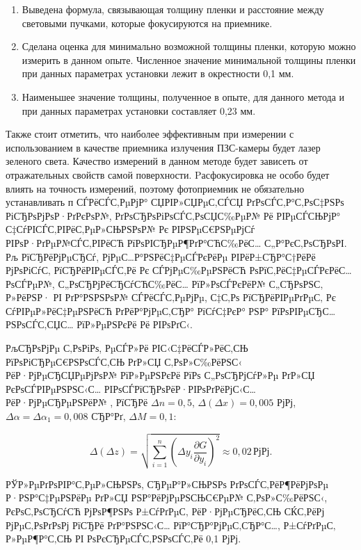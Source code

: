 \begin{enumerate}
\item Выведена формула, связывающая толщину пленки и расстояние между световыми пучками, которые фокусируются на приемнике.
\item Сделана оценка для минимально возможной толщины пленки, которую можно измерить в данном опыте. Численное значение минимальной толщины пленки при данных параметрах установки лежит в окрестности 0,1 мм.
\item Наименьшее значение толщины, полученное в опыте, для данного метода и при данных параметрах установки составляет 0,23 мм.
\end{enumerate}

Также стоит отметить, что наиболее эффективным при измерении с использованием в качестве приемника излучения ПЗС-камеры будет лазер зеленого света. Качество измерений в данном методе будет зависеть от отражательных свойств самой поверхности. Pасфокусировка не особо будет влиять на точность измерений, поэтому фотоприемник не обязательно устанавливать п СЃРёСЃС‚РµРјР° СЏРІР»СЏРµС‚СЃСЏ РґРѕСЃС‚Р°С‚РѕС‡РЅРѕ РіСЂРѕРјРѕР·РґРєРѕР№, РґРѕСЂРѕРіРѕСЃС‚РѕСЏС‰РµР№ Рё РІРµСЃСЊРјР° С‡СѓРІСЃС‚РІРёС‚РµР»СЊРЅРѕР№ Рє РІРЅРµС€РЅРµРјСѓ РІРѕР·РґРµР№СЃС‚РІРёСЋ РїРѕРІСЂРµР¶РґР°СЋС‰РёС… С„Р°РєС‚РѕСЂРѕРІ. Рљ РїСЂРёРјРµСЂСѓ, РјРµС…Р°РЅРёС‡РµСЃРєРёРµ РІРёР±СЂР°С†РёРё РјРѕРіСѓС‚ РїСЂРёРІРµСЃС‚Рё Рє СЃРјРµС‰РµРЅРёСЋ РѕРїС‚РёС‡РµСЃРєРёС… РѕСЃРµР№, С„РѕСЂРјРёСЂСѓСЋС‰РёС… РїР»РѕСЃРєРёР№ С„СЂРѕРЅС‚ Р»РёРЅР· РІ РґР°РЅРЅРѕР№ СЃРёСЃС‚РµРјРµ, С‡С‚Рѕ РїСЂРёРІРµРґРµС‚ Рє СѓРІРµР»РёС‡РµРЅРёСЋ РґРёР°РјРµС‚СЂР° РїСѓС‡РєР° РЅР° РїРѕРІРµСЂС…РЅРѕСЃС‚СЏС… РїР»РµРЅРєРё Рё РІРѕРґС‹.


РљСЂРѕРјРµ С‚РѕРіРѕ, РµСЃР»Рё РІС‹С‡РёСЃР»РёС‚СЊ РїРѕРіСЂРµС€РЅРѕСЃС‚СЊ РґР»СЏ С‚РѕР»С‰РёРЅС‹ РёР·РјРµСЂСЏРµРјРѕР№ РїР»РµРЅРєРё РїРѕ С„РѕСЂРјСѓР»Рµ РґР»СЏ РєРѕСЃРІРµРЅРЅС‹С… РІРѕСЃРїСЂРѕРёР·РІРѕРґРёРјС‹С… РёР·РјРµСЂРµРЅРёР№ \cite{kassandrova}, РїСЂРё $\Delta n = 0,5$, $\Delta (\Delta x)=0,005$ РјРј, $\Delta \alpha=\Delta \alpha_1 = 0,008$ СЂР°Рґ, $\Delta M=0,1$:

\begin{equation}
\Delta (\Delta z)=\sqrt{\sum_{i=1}^n \left(\Delta y_i \frac{\partial G}{\partial y_i}\right)^2} \approx 0,02 \, \text{РјРј}.
\end{equation}

РЎР»РµРґРѕРІР°С‚РµР»СЊРЅРѕ, СЂРµР°Р»СЊРЅРѕ РґРѕСЃС‚РёР¶РёРјРѕРµ Р·РЅР°С‡РµРЅРёРµ РґР»СЏ РЅР°РёРјРµРЅСЊС€РµР№ С‚РѕР»С‰РёРЅС‹, РєРѕС‚РѕСЂСѓСЋ РјРѕР¶РЅРѕ Р±СѓРґРµС‚ РёР·РјРµСЂРёС‚СЊ СЌС‚РёРј РјРµС‚РѕРґРѕРј РїСЂРё РґР°РЅРЅС‹С… РїР°СЂР°РјРµС‚СЂР°С…, Р±СѓРґРµС‚ Р»РµР¶Р°С‚СЊ РІ РѕРєСЂРµСЃС‚РЅРѕСЃС‚Рё 0,1 РјРј.

